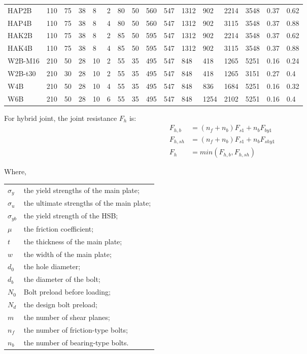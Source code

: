 \begin{table}[htbp]
\begin{tabular}{@{}llllllllllllllll@{}}
HAP2B & 110 & 75 & 38 & 8 & 2 & 80 & 50 & 560 & 547 & 1312 & 902 & 2214 & 3548 & 0.37 & 0.62 \\
HAP4B & 110 & 75 & 38 & 8 & 4 & 80 & 50 & 560 & 547 & 1312 & 902 & 3115 & 3548 & 0.37 & 0.88 \\
HAK2B & 110 & 75 & 38 & 8 & 2 & 85 & 50 & 595 & 547 & 1312 & 902 & 2214 & 3548 & 0.37 & 0.62 \\
HAK4B & 110 & 75 & 38 & 8 & 4 & 85 & 50 & 595 & 547 & 1312 & 902 & 3115 & 3548 & 0.37 & 0.88 \\
W2B-M16 & 210 & 50 & 28 & 10 & 2 & 55 & 35 & 495 & 547 & 848 & 418 & 1265 & 5251 & 0.16 & 0.24 \\
W2B-t30 & 210 & 30 & 28 & 10 & 2 & 55 & 35 & 495 & 547 & 848 & 418 & 1265 & 3151 & 0.27 & 0.4 \\
W4B & 210 & 50 & 28 & 10 & 4 & 55 & 35 & 495 & 547 & 848 & 836 & 1684 & 5251 & 0.16 & 0.32 \\
W6B & 210 & 50 & 28 & 10 & 6 & 55 & 35 & 495 & 547 & 848 & 1254 & 2102 & 5251 & 0.16 & 0.4 \\ \bottomrule
\end{tabular}
\label{tab-allcase}
\end{table}


For hybrid joint, the joint resistance $F_{h}$ \cite{Chen2023MechanicalConnections} is:
\begin{equation} \label{eq-fh}
\begin{aligned}
    F_{h,b} &= (n_f+n_b) F_{s1} + n_b F_{by1} \\
    F_{h,sh} &= (n_f+n_b) F_{s1} + n_b F_{shy1} \\
    F_{h} &= min(F_{h,b}, F_{h,sh})
\end{aligned}    
\end{equation}

Where,

\begin{tabular}{ll}
$\sigma_y$ & the yield strengths of the main plate; \\
$\sigma_u$ & the ultimate strengths of the main plate;\\
$\sigma_{yb}$ & the yield strength of the HSB; \\ 
$\mu$ & the friction coefficient;\\ 
$t$ & the thickness of the main plate; \\ 
$w$ & the width of the main plate; \\
$d_0$ & the hole diameter; \\ 
$d_b$ & the diameter of the bolt; \\ 
$N_0$ & Bolt preload before loading; \\
$N_d$ & the design bolt preload; \\
$m$ & the number of shear planes; \\ 
$n_{f}$ & the number of friction-type bolts; \\ 
$n_b$ & the number of bearing-type bolts.
\end{tabular}


